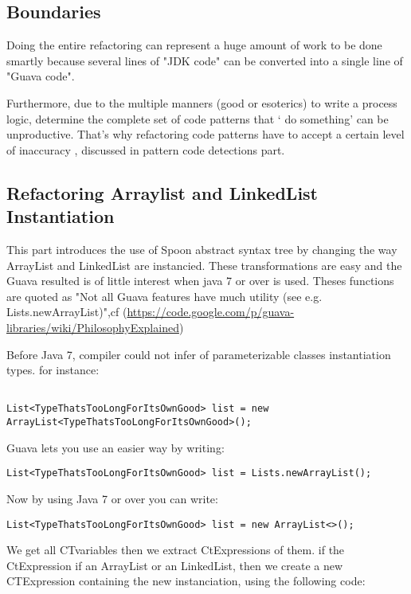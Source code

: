 \documentclass[paper=a4, fontsize=11pt]{scrartcl}
\numberwithin{equation}{section}%
\numberwithin{figure}{section}%
\numberwithin{table}{section}%
\begin{document}
\subsection{Boundaries}
Doing the entire refactoring can represent a huge amount of work to be
done smartly because several lines of "JDK code" can be converted into
a single line of "Guava code".

Furthermore, due to the multiple manners (good or esoterics) to write
a process logic,  determine the complete set of code patterns that `
do something' can be unproductive. That's why refactoring code
patterns have to accept a certain level of inaccuracy , discussed in
pattern code detections part. 

\subsection{Refactoring Arraylist and LinkedList Instantiation}

This part introduces the use of Spoon abstract syntax tree by changing
the way ArrayList and LinkedList are instancied. These transformations
are easy and the Guava resulted is of little interest when java 7 or
over is used. Theses functions are quoted as "Not all Guava features
have much utility (see e.g. Lists.newArrayList)",cf
(\url{https://code.google.com/p/guava-libraries/wiki/PhilosophyExplained})
\newpage

Before Java 7, compiler could not infer of parameterizable classes
instantiation types. for instance:
\begin{verbatim}

List<TypeThatsTooLongForItsOwnGood> list = new
ArrayList<TypeThatsTooLongForItsOwnGood>();
\end{verbatim}

Guava lets you use an easier way by writing:
\begin{verbatim}
List<TypeThatsTooLongForItsOwnGood> list = Lists.newArrayList();
\end{verbatim}

Now by using Java 7 or over you can write:
\begin{verbatim}
List<TypeThatsTooLongForItsOwnGood> list = new ArrayList<>();
\end{verbatim}

We get all CTvariables then we extract CtExpressions of them. if the
CtExpression if an ArrayList or an LinkedList, then we create a new
CTExpression containing the new instanciation, using the following
code:
\end{document}
